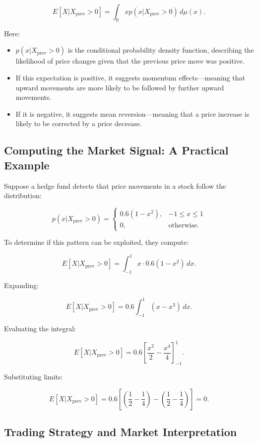 \[
E[X | X_{\text{prev}} > 0] = \int_{\mathbb{R}} x p(x | X_{\text{prev}} > 0) \, d\mu(x).
\]

Here:
\begin{itemize}
    \item \( p(x | X_{\text{prev}} > 0) \) is the conditional probability density function, describing the likelihood of price changes given that the previous price move was positive.
    \item If this expectation is positive, it suggests momentum effects—meaning that upward movements are more likely to be followed by further upward movements.
    \item If it is negative, it suggests mean reversion—meaning that a price increase is likely to be corrected by a price decrease.
\end{itemize}

\subsection{Computing the Market Signal: A Practical Example}

Suppose a hedge fund detects that price movements in a stock follow the distribution:

\[
p(x | X_{\text{prev}} > 0) =
\begin{cases} 
    0.6(1 - x^2), & -1 \leq x \leq 1 \\
    0, & \text{otherwise}.
\end{cases}
\]

To determine if this pattern can be exploited, they compute:

\[
E[X | X_{\text{prev}} > 0] = \int_{-1}^{1} x \cdot 0.6 (1 - x^2) \, dx.
\]

Expanding:

\[
E[X | X_{\text{prev}} > 0] = 0.6 \int_{-1}^{1} (x - x^3) \, dx.
\]

Evaluating the integral:

\[
E[X | X_{\text{prev}} > 0] = 0.6 \left[ \frac{x^2}{2} - \frac{x^4}{4} \right]_{-1}^{1}.
\]

Substituting limits:

\[
E[X | X_{\text{prev}} > 0] = 0.6 \left[ \left(\frac{1}{2} - \frac{1}{4} \right) - \left(\frac{1}{2} - \frac{1}{4} \right) \right] = 0.
\]

\subsection{Trading Strategy and Market Interpretation}

